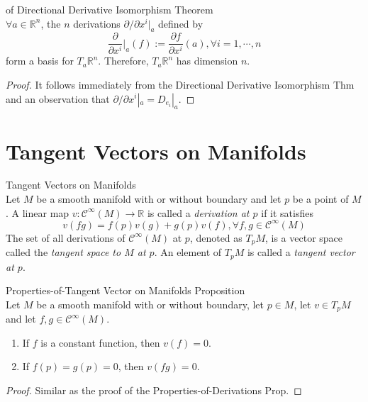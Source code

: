 \begin{corollary}{of Directional Derivative Isomorphism Theorem}\\
$\forall a\in \mathbb{R}^n$, the $n$ derivations $\partial/ \partial x^i|_a$ defined by
\[
\frac{\partial}{\partial x^i}|_a (f):= \frac{\partial f}{\partial x^i}(a) ,\forall i=1 ,\cdots, n
\]
form a basis for $T_a \mathbb{R}^n$. Therefore, $T_a \mathbb{R}^n$ has dimension $n$.
\end{corollary}

\begin{proof}
    It follows immediately from the Directional Derivative Isomorphism Thm and an observation that $\partial /\partial x^i|_a= D_{e_i}|_a$.
\end{proof}

\section{Tangent Vectors on Manifolds}

\begin{definition}{Tangent Vectors on Manifolds}\\
Let $M$ be a smooth manifold with or without boundary and let $p$ be a point of $M$. A linear map $v: \mathcal{C}^\infty (M) \to \mathbb{R}$ is called a \textit{derivation at $p$} if it satisfies
\[
v(fg)=f(p)v(g)+ g(p) v(f) ,\forall f,g \in \mathcal{C}^\infty (M)
\]
The set of all derivations of $\mathcal{C}^\infty (M)$ at $p$, denoted as $T_p M$, is a vector space called the \textit{tangent space to $M$ at $p$}. An element of $T_pM$ is called a \textit{tangent vector at $p$}.
\end{definition}

\begin{proposition}{Properties-of-Tangent Vector on Manifolds Proposition}\\
Let $M$ be a smooth manifold with or without boundary, let $p\in M$, let $v\in T_pM$ and let $f,g \in \mathcal{C}^\infty (M)$.
\begin{enumerate}
    \item If $f$ is a constant function, then $v(f)=0$.
    \item If $f(p)= g(p
    )=0$, then $v(fg)=0$.
\end{enumerate}
\end{proposition}

\begin{proof}
    Similar as the proof of the Properties-of-Derivations Prop.
\end{proof}


